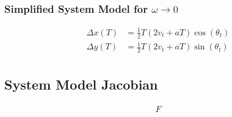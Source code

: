 \documentclass{article}
\begin{document}
\subsubsection{Simplified System Model for $\omega \to 0$}

\begin{align*}
    \Delta x(T) &= \frac{1}{2} T(2v_t+aT)\cos(\theta_t) \\
    \Delta y(T) &= \frac{1}{2} T(2v_t+aT)\sin(\theta_t) \\
\end{align*}

\subsection{System Model Jacobian}

\begin{align*}
    F

\end{align*}
\end{document}
